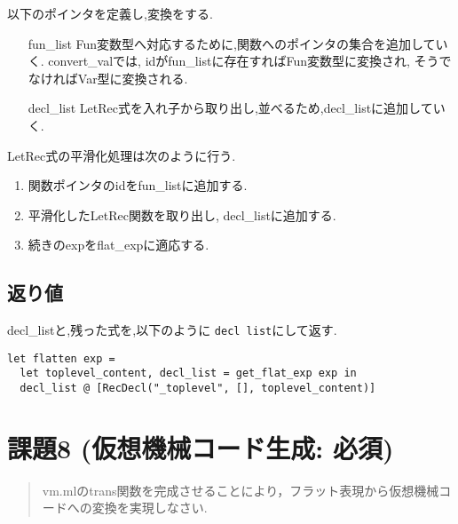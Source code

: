 以下のポインタを定義し,変換をする.

\begin{itemize}

\item[fun\_list]
Fun変数型へ対応するために,関数へのポインタの集合を追加していく. convert\_valでは, idがfun\_listに存在すればFun変数型に変換され, そうでなければVar型に変換される.

\item[decl\_list]
LetRec式を入れ子から取り出し,並べるため,decl\_listに追加していく.
\end{itemize}

LetRec式の平滑化処理は次のように行う.

\begin{enumerate}

\item 関数ポインタのidをfun\_listに追加する.
\item 平滑化したLetRec関数を取り出し, decl\_listに追加する.
\item 続きのexpをflat\_expに適応する.
\end{enumerate}

\subsection*{返り値}

decl\_listと,残った式を,以下のように \lstinline{decl list}にして返す.

\begin{lstlisting}
let flatten exp = 
  let toplevel_content, decl_list = get_flat_exp exp in
  decl_list @ [RecDecl("_toplevel", [], toplevel_content)]
\end{lstlisting}

\section*{課題8 (仮想機械コード生成: 必須)}

\begin{quotation}
vm.mlのtrans関数を完成させることにより，フラット表現から仮想機械コードへの変換を実現しなさい.
\end{quotation}

